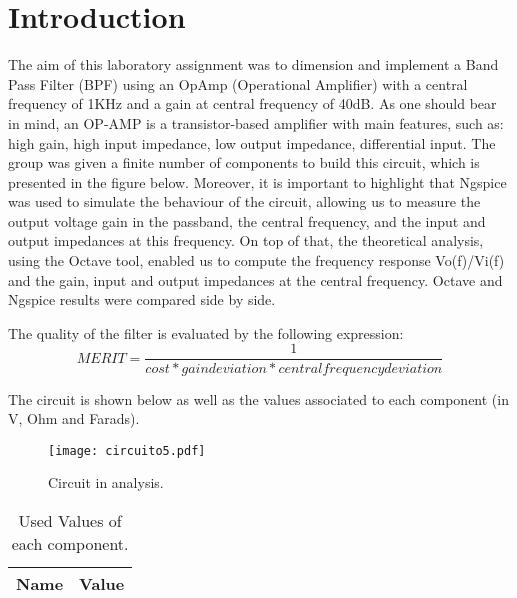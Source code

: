 \section{Introduction}
\label{introduction}


\par The aim of this laboratory assignment was to dimension and implement a Band Pass Filter (BPF) using an OpAmp (Operational Amplifier) with a central frequency of 1KHz and a gain at central frequency of 40dB. As one should bear in mind, an OP-AMP is a transistor-based amplifier with main features, such as: high gain, high input impedance, low output impedance, differential input. The group was given a finite number of components to build this circuit, which is presented in the figure below. Moreover, it is important to highlight that Ngspice was used to simulate the behaviour of the circuit, allowing us to measure the output voltage gain in the passband, the central frequency, and the input and output impedances at this frequency. On top of that, the theoretical analysis, using the Octave tool, enabled us to compute the frequency response Vo(f)/Vi(f) and the gain, input and output impedances at the central frequency. Octave and Ngspice results were compared side by side.

\par The quality of the filter is evaluated by the following expression:
\begin {equation}
	 MERIT = \frac{1}{cost * gain deviation * central frequency deviation}   	
	\label{merit}
\end{equation}

The circuit is shown below as well as the values associated to each component (in V, Ohm and Farads).

\begin{figure}[ht] \centering
\texttt{[image: circuito5.pdf]}
\caption{Circuit in analysis.}
\label{circuito todo}
\end{figure}


\begin{table}[ht]
  \centering
  \begin{tabular}{|l|r|}
    \hline    
    {\bf Name} & {\bf Value} \\ \hline
    
  \end{tabular}
  \caption{Used Values of each component.}
  \label{tab:3}
\end{table}


\newpage


